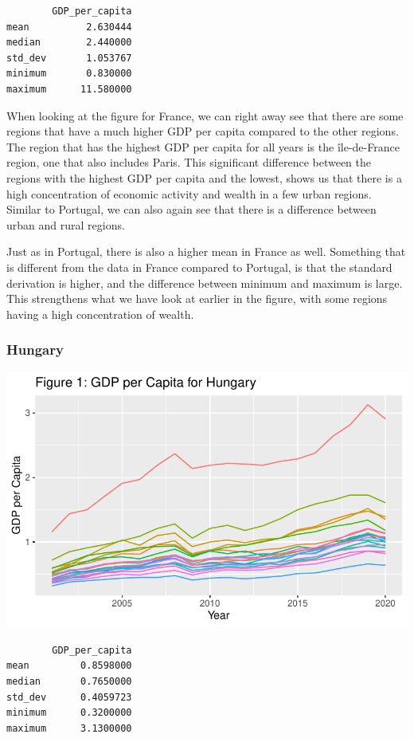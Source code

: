 \documentclass[
  a4paper,
  DIV=11,
  numbers=noendperiod]{scrartcl}
\begin{document}
\begin{verbatim}
        GDP_per_capita
mean          2.630444
median        2.440000
std_dev       1.053767
minimum       0.830000
maximum      11.580000
\end{verbatim}

When looking at the figure for France, we can right away see that there
are some regions that have a much higher GDP per capita compared to the
other regions. The region that has the highest GDP per capita for all
years is the île-de-France region, one that also includes Paris. This
significant difference between the regions with the highest GDP per
capita and the lowest, shows us that there is a high concentration of
economic activity and wealth in a few urban regions. Similar to
Portugal, we can also again see that there is a difference between urban
and rural regions.

Just as in Portugal, there is also a higher mean in France as well.
Something that is different from the data in France compared to
Portugal, is that the standard derivation is higher, and the difference
between minimum and maximum is large. This strengthens what we have look
at earlier in the figure, with some regions having a high concentration
of wealth.

\hypertarget{hungary}{%
\subsubsection{Hungary}\label{hungary}}

\includegraphics{assignment_1_files/figure-pdf/unnamed-chunk-13-1.pdf}

\begin{verbatim}
        GDP_per_capita
mean         0.8598000
median       0.7650000
std_dev      0.4059723
minimum      0.3200000
maximum      3.1300000
\end{verbatim}
\end{document}

